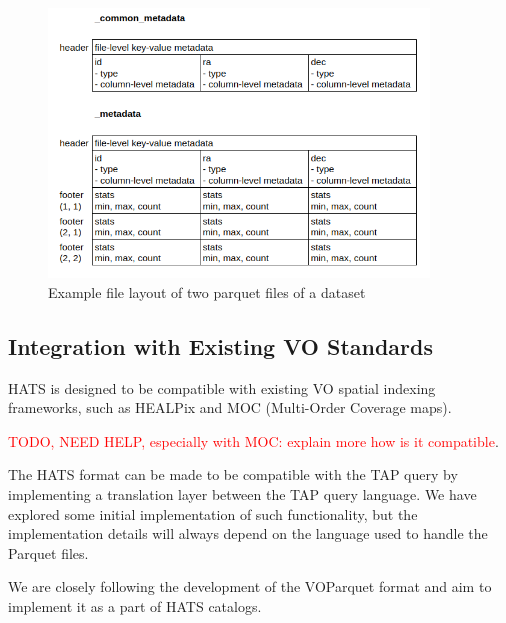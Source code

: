 \documentclass[11pt,a4paper]{ivoa}
\begin{document}
\begin{figure}
\centering
\includegraphics[width=0.9\textwidth]{metadata_files.png}
\caption{Example file layout of two parquet files of a dataset}
\label{fig:parquetMetadata}
\end{figure}


    \subsection{Integration with Existing VO Standards}
    HATS is designed to be compatible with existing VO spatial indexing frameworks, such as HEALPix and MOC (Multi-Order Coverage maps). \par
   \textcolor{red}{TODO, NEED HELP, especially with MOC: explain more how is it compatible}. \par 
   The HATS format can be made to be compatible with the TAP query by implementing a translation layer between the TAP query language. We have explored some initial implementation of such functionality, but the implementation details will always depend on the language used to handle the Parquet files. \par
  We are closely following the development of the VOParquet format and aim to implement it as a part of HATS catalogs.
\end{document}
